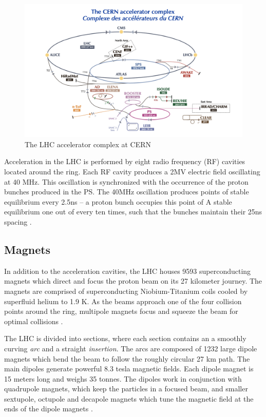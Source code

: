 \begin{figure}
	\includegraphics[width=\textwidth]{figures/ch2/accelerator_complex.png}
	\caption{The LHC accelerator complex at CERN \cite{cern_accelerator_complex}}
	\label{fig:accelerator_complex}
\end{figure}

 Acceleration in the LHC is performed by eight radio frequency (RF) cavities located around the ring. Each RF cavity produces a 2MV electric field oscillating at 40 MHz. This oscillation is synchronized with the occurrence of the proton bunches produced in the PS. The 40MHz oscillation produces points of stable equilibrium every 2.5ns -- a proton bunch occupies this point of A stable equilibrium one out of every ten times, such that the bunches maintain their 25ns spacing \cite{lhc_faq}. \\

\subsection{Magnets}
In addition to the acceleration cavities, the LHC houses 9593 superconducting magnets which direct and focus the proton beam on its 27 kilometer journey. The magnets are comprised of superconducting Niobium-Titanium coils cooled by superfluid helium to 1.9 K. As the beams approach one of the four collision points around the ring, multipole magnets focus and squeeze the beam for optimal collisions \cite{lhc_faq}.

The LHC is divided into sections, where each section contains an a smoothly curving \textit{arc} and a straight \textit{insertion}. The arcs are composed of 1232 large dipole magnets which bend the beam to follow the roughly circular 27 km path. The main dipoles generate powerful 8.3 tesla magnetic fields. Each dipole magnet is 15 meters long and weighs 35 tonnes. The dipoles work in conjunction with quadrupole magnets, which keep the particles in a focused beam, and smaller sextupole, octupole and decapole magnets which tune the magnetic field at the ends of the dipole magnets \cite{lhc_magnets}.

